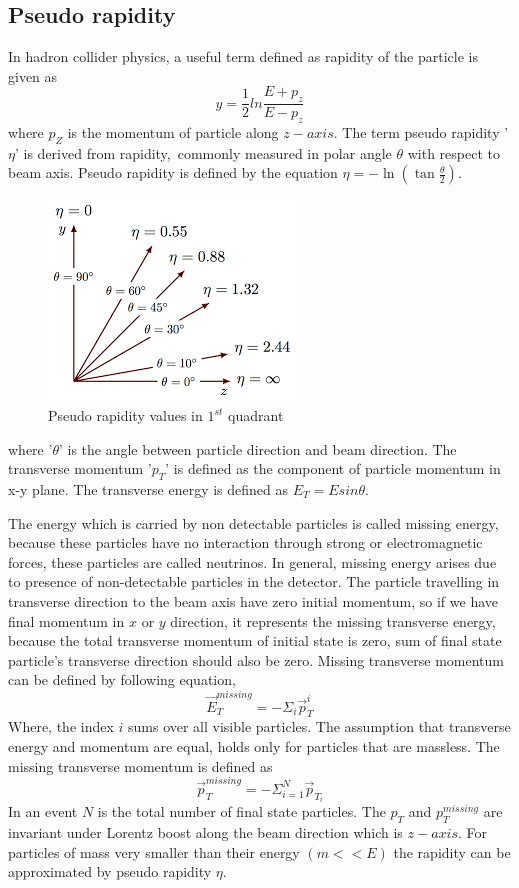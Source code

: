 \subsection{Pseudo rapidity}
In hadron collider physics, a useful term defined as rapidity of the particle is given as
\begin{equation}
y=\frac{1}{2}ln\frac{E+p_{z}}{E-p_{z}} 
\end{equation}
where $p_{Z}$ is the momentum of particle along $z-axis$. The term pseudo rapidity '$\eta$' is derived from rapidity,~commonly measured in polar angle $\theta$ with respect to beam axis. Pseudo rapidity is defined by the equation $\eta=-\ln(\tan\frac{\theta}{2})$.
\begin{figure}[H]
\centering
\includegraphics[scale=0.6]{chapter2/pseudorapidity.png}
\caption{Pseudo rapidity values in $1^{st}$ quadrant}
\end{figure}
where '$\theta$' is the angle between particle direction and beam direction.  The transverse momentum '$p_{T}$' is defined as the component of particle momentum in x-y plane. The transverse energy is defined as $E_{T} =
E sin\theta$.

The energy which is carried by non detectable particles is called missing energy, because these particles have no interaction through strong or electromagnetic forces, these particles are called neutrinos. In general, missing energy arises due to presence of non-detectable particles in the detector. The particle travelling in transverse direction to the beam axis have zero initial momentum, so if we have final momentum in $x$ or $y$ direction, it represents the missing transverse energy, because the total transverse momentum of initial state is zero, sum of final state particle’s transverse direction should also be zero. Missing transverse momentum~\cite{PortilloQuintero:2668716} can be defined by following equation,
\begin{equation}
\overrightarrow{E}_{T}^{missing}=-\Sigma_{i}\overrightarrow{p}_{T}^{i}
\end{equation}
Where, the index $i$ sums over all visible particles. The assumption that transverse energy and momentum are equal, holds only for particles that are massless.
The missing transverse momentum is defined as
\begin{equation}
\overrightarrow{p}_{T}^{missing}=-\Sigma_{i=1}^{N}\overrightarrow{p}_{T_{i}}
\end{equation}
In an event $N$ is the total number of final state particles. The $p_{T} $ and $p_{T}^{missing}$ are invariant under Lorentz boost along the beam direction which is $z-axis$. 
For particles of mass very smaller than their energy $(m<<E)$ the rapidity can be approximated by pseudo rapidity $\eta$.
